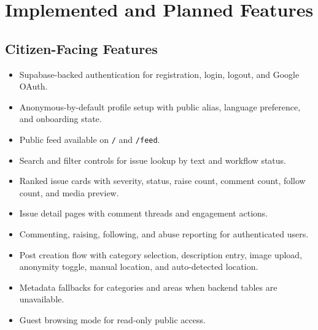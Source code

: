 \documentclass[11pt,a4paper]{article}
\begin{document}
\section{Implemented and Planned Features}
\subsection{Citizen-Facing Features}
\begin{itemize}
  \item Supabase-backed authentication for registration, login, logout, and Google OAuth.
  \item Anonymous-by-default profile setup with public alias, language preference, and onboarding state.
  \item Public feed available on \texttt{/} and \texttt{/feed}.
  \item Search and filter controls for issue lookup by text and workflow status.
  \item Ranked issue cards with severity, status, raise count, comment count, follow count, and media preview.
  \item Issue detail pages with comment threads and engagement actions.
  \item Commenting, raising, following, and abuse reporting for authenticated users.
  \item Post creation flow with category selection, description entry, image upload, anonymity toggle, manual location, and auto-detected location.
  \item Metadata fallbacks for categories and areas when backend tables are unavailable.
  \item Guest browsing mode for read-only public access.
\end{itemize}
\end{document}
